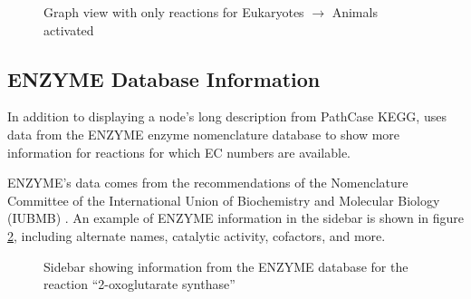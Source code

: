 \begin{figure}[hbt]
    \caption{\label{fig:kegg_screenshot_animals_only_graph} Graph view with only
    reactions for Eukaryotes $\rightarrow$ Animals activated}
\end{figure}

\subsection{ENZYME Database Information}

In addition to displaying a node's long description from PathCase KEGG, \keggapp
uses data from the ENZYME enzyme nomenclature database to show more information
for reactions for which EC numbers are available.

ENZYME's data comes from the recommendations of the Nomenclature Committee of
the International Union of Biochemistry and Molecular Biology (IUBMB)
\cite{enzyme-database}. An example of ENZYME information in the sidebar is shown
in figure \ref{fig:kegg_screenshot_selection_info}, including alternate names,
catalytic activity, cofactors, and more.

\begin{figure}[hbt]
    \caption{\label{fig:kegg_screenshot_selection_info} Sidebar showing
    information from the ENZYME database for the reaction ``2-oxoglutarate
    synthase''}
\end{figure}
